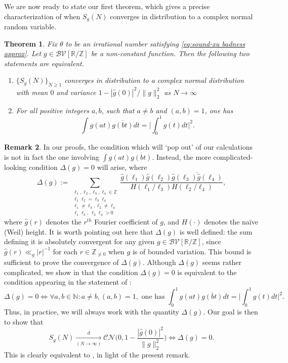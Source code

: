 \documentclass[12pt]{amsart}
\renewcommand{\geq}{\geqslant}
\numberwithin{equation}{section}
\theoremstyle{plain}
\newtheorem{thm}{Theorem}[section]
\theoremstyle{definition}
\newtheorem{rem}[thm]{Remark}
\renewcommand{\l}{\ell}
\newcommand{\N}{\mathbb{N}}
\newcommand{\Z}{\mathbb{Z}}
\newcommand{\R}{\mathbb{R}}
\newcommand{\CB}{\mathcal{B}}
\newcommand{\CC}{\mathcal{C}}
\newcommand{\CN}{\mathcal{N}}
\newcommand{\CV}{\mathcal{V}}
\begin{document}
	We are now ready to state our first theorem, which gives a precise characterization of when $S_g(N)$ converges in distribution to a complex normal random variable.
	\begin{thm}\label{thm:A}
		Fix $\theta$ to be an irrational number satisfying \eqref{eq:sound-xu badness approx}. Let $g \in \CB\CV[\R/\Z]$ be a non-constant function. Then the following two statements are equivalent.
		\begin{enumerate}
			\item  $\{S_{g}(N)\}_{N \geq 1}$ converges in distribution to a complex normal distribution with mean $0$ and variance $1-|\hat{g}(0)|^2/\|g\|_2^2$ as $N \to \infty$
			\item For all positive integers $a,b$, such that $a \ne b$ and $(a,b) = 1$, one has $$\int g(at)\overline{g(bt)}dt = \bigg|\int_0^1 g(t)dt \bigg|^2.$$
		\end{enumerate}
	\end{thm}
	\begin{rem}\label{rem Delta} 
		In our proofs, the condition which will `pop out' of our calculations is not in fact the one involving $\int g(at)\overline{g(bt)}$. Instead, the more complicated-looking condition $\Delta(g) = 0$ will arise, where
		\begin{equation}\label{eq: def Delta}
			\Delta(g) :=  \sum_{\substack{\l_1,\l_2,\l_3,\l_4 \in \Z \\ \l_1\l_2 = \l_3\l_4 \\ \l_1 \ne \l_3, \l_2 \ne \l_4 \\ \l_1 \l_3,\: \l_2\l_4 > 0}}\frac{\hat{g}(\l_1)\hat{g}(\l_2) \overline{\hat{g}(\l_3)\hat{g}(\l_4)}}{H(\l_1/\l_3)H(\l_2/\l_4)},
		\end{equation}
		where $\hat{g}(r)$ denotes the $r^{th}$ Fourier coefficient of $g$, and $H(\cdot)$ denotes the na\"ive (Weil) height. It is worth pointing out here that $\Delta(g)$ is well defined: the sum defining it is absolutely convergent for any given $g \in \CB\CV[\R/\Z]$, since $\hat{g}(r) \ll_g |r|^{-1}$ for each $r \in \Z_{\ne 0}$ when $g$ is of bounded variation. This bound is sufficient to prove the convergence of $\Delta(g)$. Although $\Delta(g)$ seems rather complicated, we show in  that the condition $\Delta(g) = 0$ is equivalent to the condition appearing in the statement of :
		$$\Delta(g) = 0\iff \forall a,b \in \N: a \ne b, (a,b) = 1, \text{ one has } \int_0^1 g(at)\overline{g(bt)}dt = \bigg|\int_0^1 g(t)dt\bigg|^2.$$
		Thus, in practice, we will always work with the quantity  $\Delta(g)$. Our goal is then to show that $$S_{g}(N) \xrightarrow[(N \to \infty)]{d} \CC\CN\bigg(0,1-\frac{|\hat{g}(0)|^2}{\|g\|_2^2}\bigg) \iff \Delta(g) = 0.$$
		This is clearly equivalent to , in light of the present remark.
	\end{rem}
\end{document}
